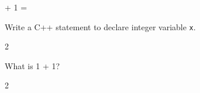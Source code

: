 

\renewcommand\AUTHOR{jdoe5@cougars.ccis.edu} %


\topmattertwo

 + 1 = 

\nextq
Write a C++ statement to declare integer variable \verb!x!.
\\
\ANSWER
\begin{answercode}
2
\end{answercode}

\nextq
What is 1 + 1?
\\
\ANSWER
\begin{answerlong}
2
\end{answerlong}

\newpage

